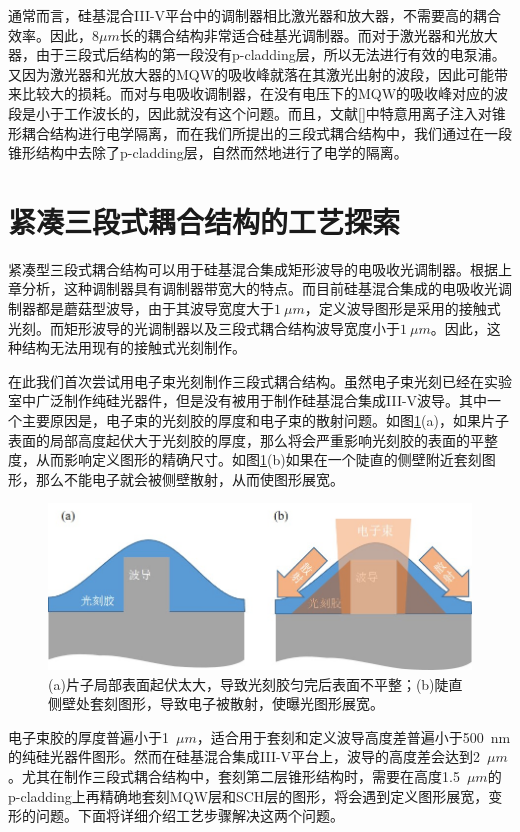通常而言，硅基混合III-V平台中的调制器相比激光器和放大器，不需要高的耦合效率。因此，$8 \mu m$长的耦合结构非常适合硅基光调制器。而对于激光器和光放大器，由于三段式后结构的第一段没有p-cladding层，所以无法进行有效的电泵浦。又因为激光器和光放大器的MQW的吸收峰就落在其激光出射的波段，因此可能带来比较大的损耗。而对与电吸收调制器，在没有电压下的MQW的吸收峰对应的波段是小于工作波长的，因此就没有这个问题。而且，文献[]中特意用离子注入对锥形耦合结构进行电学隔离，而在我们所提出的三段式耦合结构中，我们通过在一段锥形结构中去除了p-cladding层，自然而然地进行了电学的隔离。
\section{紧凑三段式耦合结构的工艺探索}
紧凑型三段式耦合结构可以用于硅基混合集成矩形波导的电吸收光调制器。根据上章分析，这种调制器具有调制器带宽大的特点。而目前硅基混合集成的电吸收光调制器都是蘑菇型波导，由于其波导宽度大于$1~\mu m$，定义波导图形是采用的接触式光刻。而矩形波导的光调制器以及三段式耦合结构波导宽度小于$1~\mu m$。因此，这种结构无法用现有的接触式光刻制作。

在此我们首次尝试用电子束光刻制作三段式耦合结构。虽然电子束光刻已经在实验室中广泛制作纯硅光器件，但是没有被用于制作硅基混合集成III-V波导。其中一个主要原因是，电子束的光刻胶的厚度和电子束的散射问题。如图\ref{fig_ch3_ele_sca}(a)，如果片子表面的局部高度起伏大于光刻胶的厚度，那么将会严重影响光刻胶的表面的平整度，从而影响定义图形的精确尺寸。如图\ref{fig_ch3_ele_sca}(b)如果在一个陡直的侧壁附近套刻图形，那么不能电子就会被侧壁散射，从而使图形展宽。
\begin{figure}[htb]
	\centering
	\includegraphics[width=12cm]{./Pictures/fig_ch3_ele_sca.jpg}
	\caption{(a)片子局部表面起伏太大，导致光刻胶匀完后表面不平整；(b)陡直侧壁处套刻图形，导致电子被散射，使曝光图形展宽。}
	\label{fig_ch3_ele_sca}
\end{figure}

电子束胶的厚度普遍小于1~$\mu m$，适合用于套刻和定义波导高度差普遍小于500~nm的纯硅光器件图形。然而在硅基混合集成III-V平台上，波导的高度差会达到2~$\mu m$。尤其在制作三段式耦合结构中，套刻第二层锥形结构时，需要在高度1.5~$\mu m$的p-cladding上再精确地套刻MQW层和SCH层的图形，将会遇到定义图形展宽，变形的问题。下面将详细介绍工艺步骤解决这两个问题。

